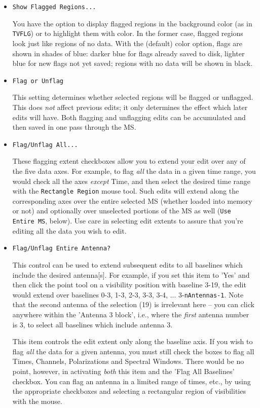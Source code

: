\begin{itemize}

\item {\tt Show Flagged Regions...}

You have the option to display flagged regions in the background
color (as in {\tt TVFLG}) or to highlight them with color.
In the former case, flagged regions look just like regions of no
data.  With the (default) color option, flags are shown in shades of blue:
darker blue for flags already saved to disk, lighter blue for
new flags not yet saved; regions with no data will be shown in black.

\item {\tt Flag or Unflag}

This setting determines whether selected regions will be flagged or
unflagged.  This does {\it not} affect previous
edits; it only determines the effect which later edits
will have.  Both flagging and unflagging edits can be accumulated
and then saved in one pass through the MS.

\item {\tt Flag/Unflag All...}

These flagging extent checkboxes allow you to extend your edit over any
of the five data axes.  For example, to flag {\it all} the data in a given
time range, you would check all the axes {\it except} Time, and then
select the desired time range with the {\tt Rectangle Region} mouse tool.
Such edits will extend along the corresponding axes over the entire selected
MS (whether loaded into memory or not) and optionally over unselected 
portions of the MS as well ({\tt Use Entire MS}, below).  Use care in
selecting edit extents to assure that you're editing all
the data you wish to edit.

\item {\tt Flag/Unflag Entire Antenna?}

This control can be used to extend subsequent edits to all baselines
which include the desired antenna[s].  For example, if you set this item
to 'Yes' and then click the point tool on a visibility position with
baseline 3-19, the edit would extend over baselines 0-3, 1-3, 2-3, 3-3,
3-4, ... 3-{\tt nAntennas-1}.  Note that the second antenna of the selection
(19) is irrelevant here -- you can click anywhere within the 'Antenna 3 block',
i.e., where the {\em first} antenna number is 3, to select all baselines
which include antenna 3.

This item controls the edit extent only along the baseline axis.  If you
wish to flag {\it all} the data for a given antenna, you must still check
the boxes to flag all Times, Channels, Polarizations and Spectral Windows.
There would be no point, however, in activating {\it both} this item and
the 'Flag All Baselines' checkbox.  You can flag an antenna in a limited
range of times, etc., by using the appropriate checkboxes and selecting
a rectangular region of visibilities with the mouse. 


\end{itemize}
